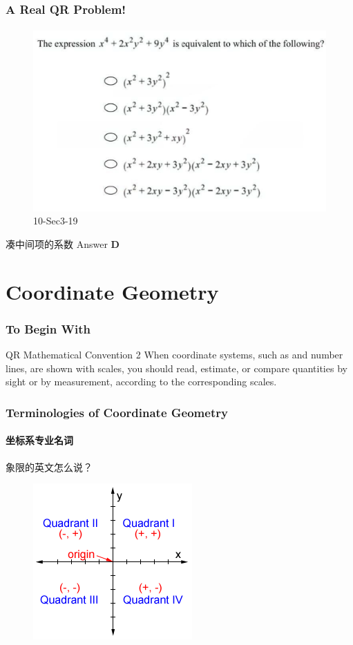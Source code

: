 \documentclass[
	11pt, %
]{beamer}
\begin{document}
\begin{frame}
	\frametitle{A Real QR Problem!}
	\framesubtitle{}
	\begin{figure}
		\includegraphics[width=0.7\linewidth]{Algebra_Expression_Example_Question1.png}
		\caption{10-Sec3-19}
	\end{figure}
	\pause
 凑中间项的系数
\pause
\bigskip
Answer \textbf{D } 
\end{frame}

\section{Coordinate Geometry}
\begin{frame}
	\frametitle{To Begin With}
	\begin{block}{QR Mathematical Convention 2 }
		When coordinate systems, such as and number lines, are
shown with scales, you should read, estimate, or compare quantities by
sight or by measurement, \alert{according to the corresponding scales}.
	\end{block}
\end{frame}




\begin{frame}
	\frametitle{Terminologies of Coordinate Geometry}
	\framesubtitle{坐标系专业名词}
	{\LARGE 象限的英文怎么说？}
	\pause
	\begin{figure}
		\includegraphics[width=0.5\linewidth]{Signs_Of_Quadrant.png}
	\end{figure}
\end{frame}
\end{document}
